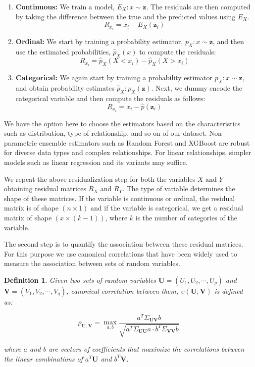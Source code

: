 \documentclass{uai2025} %
\newtheorem{definition}{Definition}
\begin{document}
\begin{enumerate}
	\item \textbf{Continuous:} We train a model, $ E_X: x \sim
		\bm{z} $. The residuals are then computed by taking the difference
		between the true and the predicted values using $ E_X $. 
		$$ R_{x_i} = x_i - E_X(\bm{z}_i) $$
	\item \textbf{Ordinal:} We start by training a probability estimator, $
		p_X: x \sim \bm{z} $, and then use the estimated probabilities, 
		$ \hat{p}_X(x) $ to compute the residuals:
		$$ R_{x_i} = \hat{p}_X(X < x_i) - \hat{p}_X(X > x_i) $$
	\item \textbf{Categorical:} We again start by training a probability
		estimator $ p_X: x \sim \bm{z} $, and obtain probability
		estimates $ \hat{p}_X: p_X(\bm{z}) $. Next, we dummy encode the
		categorical variable and then compute the residuals as follows: 
		$$ R_{x_i} = x_i - \hat{p}(\bm{z}_i) $$
\end{enumerate}

We have the option here to choose the estimators based on the characteristics
such as distribution, type of relationship, and so on of our dataset.
Non-parametric ensemble estimators such as Random Forest and XGBoost are robust 
for diverse data types and complex relationships. For linear relationships,
simpler models such as linear regression and its variants may suffice.

We repeat the above residualization step for both the variables $ X $ and $ Y $
obtaining residual matrices $ R_X $ and $ R_Y $. The type of variable determines
the shape of these matrices. If the variable is continuous or ordinal, the 
residual matrix is of shape $ (n \times 1 ) $ and if the variable is categorical,
we get a residual matrix of shape $ (x \times (k - 1)) $, where $ k $ is the number
of categories of the variable.

The second step is to quantify the association between these residual matrices.
For this purpose we use canonical correlations \citep{Hotelling1936} that have been widely used to
measure the association between sets of random variables.

\begin{definition}
	Given two sets of random variables $ \bm{U} = (U_1, U_2, \cdots, U_p) $
	and $ \bm{V} = (V_1, V_2, \cdots, V_q) $, canonical correlation between
	them, $\upsilon(\bm{U}, \bm{V}) $ is defined as:
		
	\begin{equation}
		\rho_{\bm{U}, \bm{V}} = \max_{a, b} \frac{a^T \Sigma_{\bm{UV}} b}{\sqrt{a^T \Sigma_{\bm{UU}} a \cdot b^T \Sigma_{\bm{VV}} b}}
	\end{equation}

	where $ a $ and $ b $ are vectors of coefficients that maximize the correlations
	between the linear combinations of $ a^T \bm{U} $ and $ b^T \bm{V} $.
\end{definition}
\end{document}
